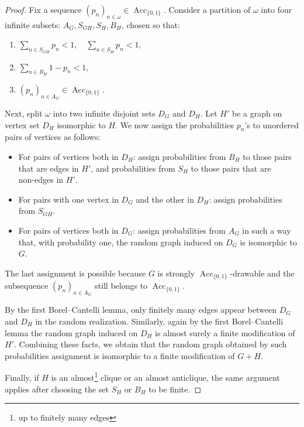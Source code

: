 \documentclass{amsart}
\theoremstyle{plain}
\theoremstyle{definition}
\theoremstyle{remark}
\numberwithin{equation}{section}
\DeclareMathOperator{\Acc}{Acc}
\begin{document}
\begin{proof}
Fix a sequence \((p_n)_{n\in\omega}\in\Acc_{\{0,1\}}\).  
Consider a partition of $
   \omega$ into four infinite subsets: $A_G, S_{GH}, S_H, B_H$, chosen so that: 

   \begin{enumerate}
    \item $\sum\limits_{n\in S_{GH}}p_n<1,\quad \sum\limits_{n\in S_H}p_n<1,$
       \item $\sum\limits_{n\in B_H}1-p_n<1,$
       \item $(p_n)_{n\in A_G}\in \Acc_{\{0,1\}}$.  
   \end{enumerate}

Next, split \(\omega\) into two infinite disjoint sets \(D_G\) and \(D_H\). Let \(H'\) be a graph on vertex set \(D_H\) isomorphic to \(H\). We now assign the
probabilities \(p_n\)'s to unordered pairs of vertices as follows:

\begin{itemize}
  \item For pairs of vertices both in \(D_H\): assign probabilities from
    \(B_H\) to those pairs that are edges in \(H'\), and probabilities from
    \(S_H\) to those pairs that are non‑edges in \(H'\).
  \item For pairs with one vertex in \(D_G\) and the other in \(D_H\): assign
    probabilities from \(S_{GH}\).
  \item For pairs of vertices both in \(D_G\): assign probabilities from
    \(A_G\) in such a way that, with probability one, the
    random graph induced on \(D_G\) is isomorphic to \(G\). 
\end{itemize}

The last assignment is possible because \(G\) is strongly
\(\Acc_{\{0,1\}}\)-drawable and the subsequence
\((p_n)_{n\in A_G}\) still belongs to \(\Acc_{\{0,1\}}\).

By the first Borel--Cantelli lemma, only finitely many edges appear between \(D_G\)
and \(D_H\) in the random realization.  Similarly, again by
the first Borel--Cantelli lemma the random graph induced on \(D_H\) is almost surely a finite modification of \(H'\). Combining these facts, we obtain that the random graph obtained by such probabilities assignment is isomorphic to a finite modification of \(G+H\).

Finally, if \(H\) is an almost\footnote{up to finitely many edges} clique or an almost anticlique, the
same argument applies after choosing the set \(S_H\) or \(B_H\) to be finite.
\end{proof}
\end{document}
